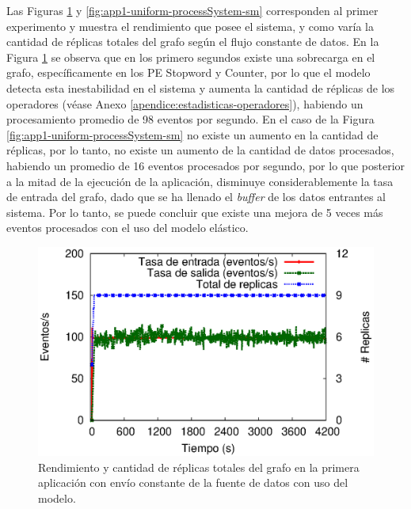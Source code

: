 
Las Figuras \ref{fig:app1-uniform-processSystem-cm} y \ref{fig:app1-uniform-processSystem-sm} \normalsize{corresponden al primer experimento y muestra el rendimiento que posee el sistema, y como varía la cantidad de réplicas totales del grafo según el flujo constante de datos.} En la Figura \ref{fig:app1-uniform-processSystem-cm} \normalsize{se observa que en los primero segundos existe una sobrecarga en el grafo, específicamente en los PE Stopword y Counter, por lo que el modelo detecta esta inestabilidad en el sistema y aumenta la cantidad de réplicas de los operadores} (véase Anexo \ref{apendice:estadisticas-operadores}), \normalsize{habiendo un procesamiento promedio de  98 eventos por segundo.} En el caso de la Figura \ref{fig:app1-uniform-processSystem-sm} \normalsize{no existe un aumento en la cantidad de réplicas, por lo tanto, no existe un aumento de la cantidad de datos procesados, habiendo un promedio de 16 eventos procesados por segundo, por lo que posterior a la mitad de la ejecución de la aplicación, disminuye considerablemente la tasa de entrada del grafo, dado que se ha llenado el \textit{buffer} de los datos entrantes al sistema. Por lo tanto, se puede concluir que existe una mejora de 5 veces más eventos procesados con el uso del modelo elástico.}

\begin{figure}[!ht]
	\centering
	\includegraphics[scale=0.65]{images/exp/app1/uniform/cm/processSystem.eps}
    \caption{Rendimiento y cantidad de réplicas totales del grafo en la primera aplicación con envío constante de la fuente de datos con uso del modelo.}
	\label{fig:app1-uniform-processSystem-cm}
\end{figure}

